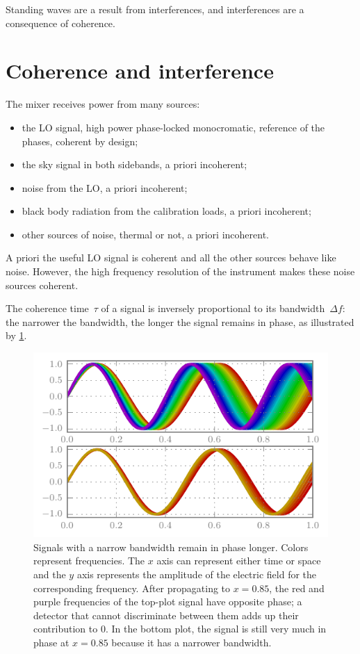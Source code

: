 Standing waves are a result from interferences, and interferences are a consequence of coherence.

\section{Coherence and interference}
The mixer receives power from many sources:
\begin{itemize}
    \item the LO signal, high power phase-locked monocromatic, reference of the phases, coherent by design;
    \item the sky signal in both sidebands, a priori incoherent;
    \item noise from the LO, a priori incoherent;
    \item black body radiation from the calibration loads, a priori incoherent;
    \item other sources of noise, thermal or not, a priori incoherent.
\end{itemize}
A priori the useful LO signal is coherent and all the other sources behave like noise.
However, the high frequency resolution of the instrument makes these noise sources coherent.

The coherence time~$\tau$ of a signal is inversely proportional to its bandwidth~$\Delta f$:
the narrower the bandwidth, the longer the signal remains in phase, as illustrated by \cref{fig:coherence}.
\begin{figure}[hbtp]
    \centering
    \includegraphics{coherence}
    \caption{
        Signals with a narrow bandwidth remain in phase longer.
        Colors represent frequencies.
        The $x$ axis can represent either time or space and the $y$ axis represents the amplitude of the electric field for the corresponding frequency.
        After propagating to $x=0.85$, the red and purple frequencies of the top-plot signal have opposite phase; a detector that cannot discriminate between them adds up their contribution to 0.
        In the bottom plot, the signal is still very much in phase at $x=0.85$
        because it has a narrower bandwidth.
    }
    \label{fig:coherence}
\end{figure}

